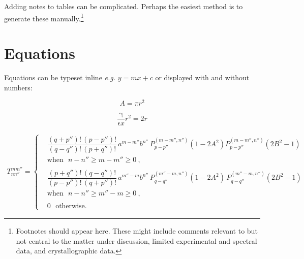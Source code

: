 \documentclass[twoside,twocolumn,9pt]{article}
\begin{document}
Adding notes to tables can be complicated.  Perhaps the easiest method is to generate these manually.\footnote[4]{Footnotes should appear here. These might include comments relevant to but not central to the matter under discussion, limited experimental and spectral data, and crystallographic data.}


\section{Equations}

Equations can be typeset inline \textit{e.g.} $ y = mx + c$ or displayed with and without numbers:

 \[ A = \pi r^2 \]

\begin{equation}
  \frac{\mathrm{\gamma}}{\mathrm{\epsilon}x} r^2 = 2r
\end{equation}
\pagebreak
\begin{widetext}
\begin{eqnarray} \label{e27}
T_{nn''}^{mm''}=
\begin{cases}
& \dfrac{(q{+}p'')!\,(p{-}p'')!}{(q{-}q'')!\,(p{+}q'')!}\,a^{m-m''}b^{n''}\,P_{p-p''}^{(m-m'',n'')}(1{-}2A^2)P_{p-p''}^{(m-m'',n'')}(2B^2{-}1)~~~ \\ & \text{when}~~~n-n''\geq m-m''\geq0~,\\
\\
& \dfrac{(p{+}q'')!\,(q{-}q'')!}{(p{-}p'')!\,(q{+}p'')!}\,a^{m''-m}b^{n''}\,P_{q-q''}^{(m''-m,n'')}(1{-}2A^2)\,P_{q-q''}^{(m''-m,n'')}(2B^2{-}1)~~~ \\ & \text{when}~~~ n-n''\geq m''-m\geq0~, \\
\\
&0 ~~~ \text{otherwise}.
\end{cases}
\end{eqnarray}
\end{widetext}
\end{document}
